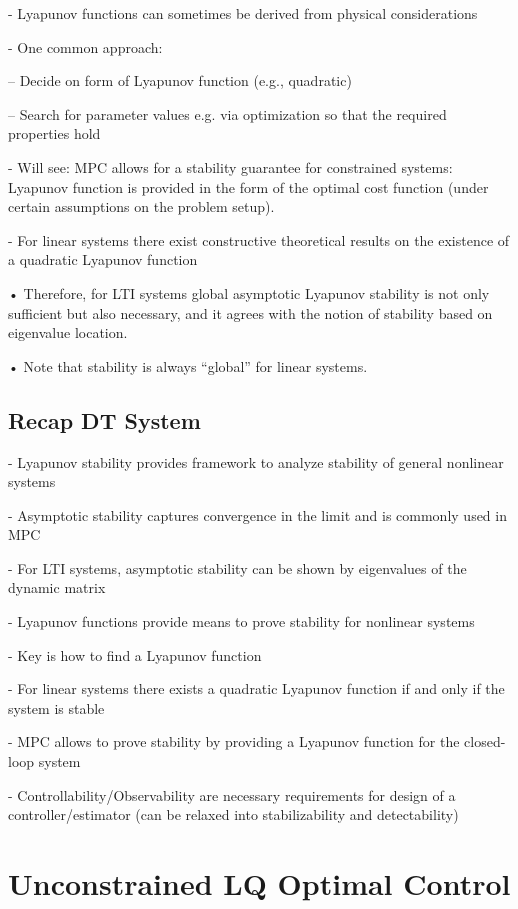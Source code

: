 -  Lyapunov functions can sometimes be derived from physical considerations

-  One common approach:

--  Decide on form of Lyapunov function (e.g., quadratic)

--  Search for parameter values e.g. via optimization so that the required
properties hold

-  Will see: MPC allows for a stability guarantee for constrained systems:
Lyapunov function is provided in the form of the optimal cost function
(under certain assumptions on the problem setup).

-  For linear systems there exist constructive theoretical results on the
existence of a quadratic Lyapunov function

• Therefore, for LTI systems global asymptotic Lyapunov stability is not
only sufficient but also necessary, and it agrees with the notion of stability
based on eigenvalue location.

• Note that stability is always “global” for linear systems.


\subsection{Recap DT System}

-  Lyapunov stability provides framework to analyze stability of general
nonlinear systems

-  Asymptotic stability captures convergence in the limit and is commonly
used in MPC

-  For LTI systems, asymptotic stability can be shown by eigenvalues of the
dynamic matrix

-  Lyapunov functions provide means to prove stability for nonlinear systems

-  Key is how to find a Lyapunov function

-  For linear systems there exists a quadratic Lyapunov function if and only if
the system is stable

-  MPC allows to prove stability by providing a Lyapunov function for the
closed-loop system

-  Controllability/Observability are necessary requirements for design of a
controller/estimator (can be relaxed into stabilizability and detectability)

\section{Unconstrained LQ Optimal Control}

